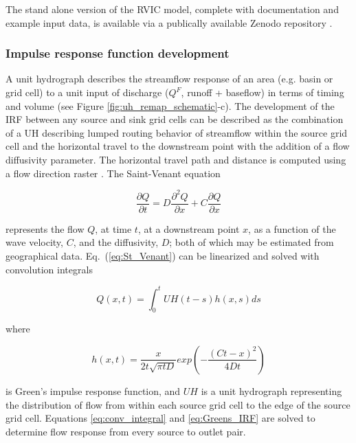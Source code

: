 \documentclass[jgrga, draft]{agutex}
\begin{document}
\begin{article}
The stand alone version of the RVIC model, complete with documentation and example input data, is available via a publically available Zenodo repository \citep{Hamman_2015}.

\subsubsection{Impulse response function development}
\label{sec:irfs}

A unit hydrograph describes the streamflow response of an area (e.g. basin or grid cell) to a unit input of discharge ($Q^F$, runoff + baseflow) in terms of timing and volume (see Figure \ref{fig:uh_remap_schematic}-c).
The development of the IRF between any source and sink grid cells can be described as the combination of a UH describing lumped routing behavior of streamflow within the source grid cell and the horizontal travel to the downstream point with the addition of a flow diffusivity parameter.
The horizontal travel path and distance is computed using a flow direction raster \citep[e.g.][]{Wu_2011}.
The Saint-Venant equation

 \begin{equation}
   \label{eq:St_Venant}
   \frac{\partial Q}{\partial t} = D \frac{\partial^2 Q}{\partial x} + C \frac{\partial Q}{\partial x}
 \end{equation}

represents the flow $Q$, at time $t$, at a downstream point $x$, as a function of the wave velocity, $C$, and the diffusivity, $D$; both of which may be estimated from geographical data. Eq.~(\ref{eq:St_Venant}) can be linearized and solved with convolution integrals

 \begin{equation}
   \label{eq:conv_integral}
	  Q(x,t) = \int_0^t UH(t-s)h(x,s)ds
 \end{equation}

where

 \begin{equation}
   \label{eq:Greens_IRF}
	h(x, t) = \frac{x}{2t\sqrt{\pi tD}}exp\left(-\frac{(Ct-x)^2}{4Dt}\right)
 \end{equation}

is Green's impulse response function, and $UH$ is a unit hydrograph representing the distribution of flow from within each source grid cell to the edge of the source grid cell.
Equations \ref{eq:conv_integral} and \ref{eq:Greens_IRF} are solved to determine flow response from every source to outlet pair.


\end{article}
\end{document}
